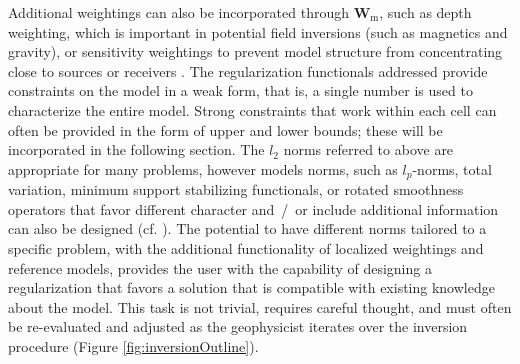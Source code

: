 \documentclass[preprint,review,3p,times,onecolumn,authoryear]{elsarticle}
\newcommand{\Wm}{\mathbf{W}_\text{m}}
\newcommand{\deriv}[2]{\frac{d #1}{d #2}}
\begin{document}
Additional weightings can also be incorporated through $\Wm$, such as depth weighting, which is important in
potential field inversions (such as magnetics and gravity), or sensitivity weightings to prevent model structure from
concentrating close to sources or receivers \citep{li19963,li2000joint}.
The regularization functionals addressed provide constraints on the model
in a weak form, that is, a single number is used to characterize the entire model.
Strong constraints that work within each cell can often be provided
in the form of upper and lower bounds; these will be incorporated in the following section.
The $l_2$ norms referred to above are appropriate for many problems, however models norms,
such as $l_p$-norms, total variation, minimum support stabilizing functionals, or rotated smoothness operators that favor different character and~/~or include
additional information can also be designed (cf. \cite{oldenburg1984introduction,DougTutorial,claerbout1973robust,strong2003edge,Zhdanov2002,Li2000}).
The potential to have different norms tailored to a specific problem, with the
additional functionality of localized weightings and reference models, provides the user with the
capability of designing a regularization that favors a solution that is compatible with existing knowledge about the model.
This task is not trivial, requires careful thought, and must often be re-evaluated and adjusted as the geophysicist iterates over the inversion procedure (Figure \ref{fig:inversionOutline}).
\end{document}
